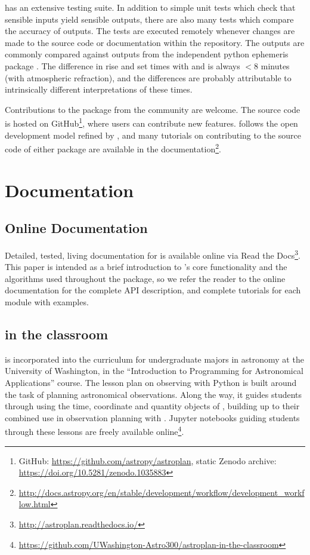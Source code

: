 \astroplan has an extensive testing suite. In addition to simple unit tests which check that sensible inputs yield sensible outputs, there are also many tests which compare the accuracy of \astroplan outputs. The tests are executed remotely whenever changes are made to the source code or documentation within the \astroplan repository. The \astroplan outputs are commonly compared against outputs from the independent python ephemeris package \pyephem \citep{pyephem}. The difference in rise and set times with \astroplan and \pyephem is always $<8$ minutes (with atmospheric refraction), and the differences are probably attributable to intrinsically different interpretations of these times.

Contributions to the package from the community are welcome. The source code is hosted on GitHub\footnote{GitHub: \url{https://github.com/astropy/astroplan}, \linebreak static Zenodo archive: \url{https://doi.org/10.5281/zenodo.1035883}}, where users can contribute new features. \astroplan follows the open development model refined by \astropy, and many tutorials on contributing to the source code of either package are available in the \astropy documentation\footnote{\url{http://docs.astropy.org/en/stable/development/workflow/development_workflow.html}}.


\section{Documentation} \label{sec:docs}

\subsection{Online Documentation} 

Detailed, tested, living documentation for \astroplan is available online via Read the Docs\footnote{\url{http://astroplan.readthedocs.io/}}. This paper is intended as a brief introduction to \astroplan's core functionality and the algorithms used throughout the package, so we refer the reader to the online documentation for the complete API description, and complete tutorials for each module with examples.

\subsection{\astroplan in the classroom} \label{sec:teaching}

\astroplan is incorporated into the curriculum for undergraduate majors in astronomy at the University of Washington, in the ``Introduction to Programming for Astronomical Applications'' course. The lesson plan on observing with Python is built around the task of planning astronomical observations. Along the way, it guides students through using the time, coordinate and quantity objects of \astropy, building up to their combined use in observation planning with \astroplan. Jupyter notebooks guiding students through these lessons are freely available online\footnote{\url{https://github.com/UWashington-Astro300/astroplan-in-the-classroom}}.

